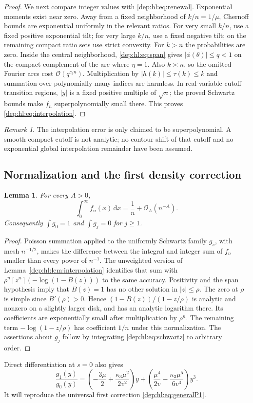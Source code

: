 \documentclass[11pt]{article}
\newtheorem{lemma}[theorem]{Lemma}
\theoremstyle{definition}\newtheorem{definition}[theorem]{Definition}
\theoremstyle{remark}\newtheorem{remark}[theorem]{Remark}
\newcommand{\OO}{\mathcal O}
\newcommand{\dd}{\,\mathrm d}
\begin{document}
\begin{proof}
We next compare integer values with \eqref{dep:hl:eq:renewal}. Exponential
moments exist near zero. Away from a fixed neighborhood of
$k/n=1/\mu$, Chernoff bounds are exponential uniformly in the relevant
ratios. For very small $k/n$, use a fixed positive exponential tilt;
for very large $k/n$, use a fixed negative tilt; on the remaining
compact ratio sets use strict convexity. For $k>n$ the probabilities
are zero. Inside the central neighborhood, \eqref{dep:hl:eq:span} gives
$|\phi(\theta)|\le q<1$ on the compact complement of the arc where
$\eta=1$. Also $k\asymp n$, so the omitted Fourier arcs cost
$\OO(q^{c_2n})$. Multiplication by $|h(k)|\le\tau(k)\le k$ and
summation over polynomially many indices are harmless. In real-variable
cutoff transition regions, $|y|$ is a fixed positive multiple of
$\sqrt n$; the proved Schwartz bounds make $f_n$ superpolynomially
small there. This proves \eqref{dep:hl:eq:interpolation}.
\end{proof}
\begin{remark}
The interpolation error is only claimed to be superpolynomial. A smooth
compact cutoff is not analytic; no contour shift of that cutoff and no
exponential global interpolation remainder have been assumed.
\end{remark}

\subsection{Normalization and the first density correction}
\begin{lemma}\label{dep:hl:lem:mass}
For every $A>0$,
\begin{equation}\label{dep:hl:eq:mass}
 \int_0^\infty f_n(x)\dd x=\frac1n+\OO_A(n^{-A}).
\end{equation}
Consequently $\int g_0=1$ and $\int g_j=0$ for $j\ge1$.
\end{lemma}
\begin{proof}
Poisson summation applied to the uniformly Schwartz family
$g_s$, with mesh $n^{-1/2}$, makes the difference between the integral
and integer sum of $f_n$ smaller than every power of $n^{-1}$.
The unweighted version of Lemma~\ref{dep:hl:lem:interpolation} identifies
that sum with $\rho^n[z^n](-\log(1-B(z)))$ to the same accuracy.
Positivity and the span hypothesis imply that $B(z)=1$ has no other
solution in $|z|\le\rho$. The zero at $\rho$ is simple since
$B'(\rho)>0$. Hence
$(1-B(z))/(1-z/\rho)$ is analytic and nonzero on a slightly larger
disk, and has an analytic logarithm there. Its coefficients are
exponentially small after multiplication by $\rho^n$. The remaining
term $-\log(1-z/\rho)$ has coefficient $1/n$ under this normalization.
The assertions about $g_j$ follow by integrating
\eqref{dep:hl:eq:schwartz} to arbitrary order.
\end{proof}
Direct differentiation at $s=0$ also gives
\begin{equation}\label{dep:hl:eq:g1}
 \frac{g_1(y)}{g_0(y)}=
 \left(-\frac{3\mu}{2}+\frac{\kappa_3\mu^2}{2v^2}\right)y
 +\left(\frac{\mu^4}{2v}-\frac{\kappa_3\mu^5}{6v^3}\right)y^3.
\end{equation}
It will reproduce the universal first correction \eqref{dep:hl:eq:generalP1}.
\end{document}
